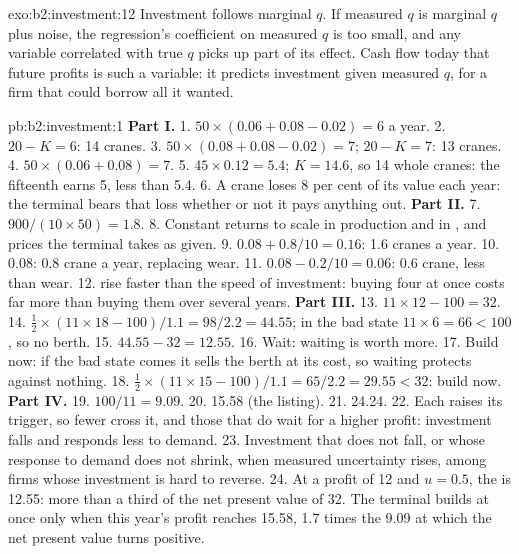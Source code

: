 \begin{solution}{exo:b2:investment:12}
Investment follows marginal $q$. If measured $q$ is marginal $q$ plus noise, the regression's coefficient on measured $q$ is
too small, and any variable correlated with true $q$ picks up part of its effect. Cash flow today that  future
profits is such a variable: it predicts investment given measured $q$, for a firm that could borrow all it wanted.
\end{solution}

\begin{solution}{pb:b2:investment:1}
\textbf{Part I.}
1. $50 \times (0.06 + 0.08 - 0.02) = 6$ a year.
2. $20 - K = 6$: 14 cranes.
3. $50 \times (0.08 + 0.08 - 0.02) = 7$; $20 - K = 7$: 13 cranes.
4. $50 \times (0.06 + 0.08) = 7$.
5. $45 \times 0.12 = 5.4$; $K = 14.6$, so 14 whole cranes: the fifteenth earns 5, less than 5.4.
6. A crane loses 8 per cent of its value each year: the terminal bears that loss whether or not it pays anything out.
\textbf{Part II.}
7. $900/(10 \times 50) = 1.8$.
8. Constant returns to scale in production and in , and prices the terminal takes as given.
9. $0.08 + 0.8/10 = 0.16$: 1.6 cranes a year.
10. $0.08$: 0.8 crane a year, replacing wear.
11. $0.08 - 0.2/10 = 0.06$: 0.6 crane, less than wear.
12.  rise faster than the speed of investment: buying four at once costs far more than buying them over
several years.
\textbf{Part III.}
13. $11 \times 12 - 100 = 32$.
14. $\tfrac12 \times (11 \times 18 - 100)/1.1 = 98/2.2 = 44.55$; in the bad state $11 \times 6 = 66 < 100$, so no berth.
15. $44.55 - 32 = 12.55$.
16. Wait: waiting is worth more.
17. Build now: if the bad state comes it sells the berth at its cost, so waiting protects against nothing.
18. $\tfrac12 \times (11 \times 15 - 100)/1.1 = 65/2.2 = 29.55 < 32$: build now.
\textbf{Part IV.}
19. $100/11 = 9.09$.
20. 15.58 (the listing).
21. 24.24.
22. Each raises its trigger, so fewer cross it, and those that do wait for a higher profit: investment falls and responds
less to demand.
23. Investment that does not fall, or whose response to demand does not shrink, when measured uncertainty rises, among
firms whose investment is hard to reverse.
24. At a profit of 12 and $u = 0.5$, the  is 12.55: more than a third of the net present value of 32. The terminal
builds at once only when this year's profit reaches 15.58, 1.7 times the 9.09 at which the net present value turns positive.
\end{solution}

